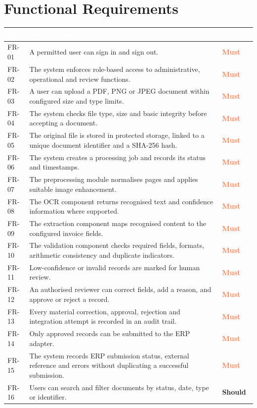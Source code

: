 \documentclass[11pt,a4paper]{report}
\newcommand{\hdr}[1]{\textcolor{white}{\sffamily\bfseries #1}}
\newcommand{\tblstart}{\rowcolors{2}{white}{rowgray}\arrayrulecolor{teal!60}}
\newcommand{\hdrrow}{\rowcolor{navy}}
\newcommand{\must}{\textcolor{coral}{\sffamily\bfseries Must}}
\newcommand{\should}{\textcolor{amber!85!black}{\sffamily\bfseries Should}}
\begin{document}
\section{Functional Requirements}
{\tblstart\small
\begin{longtable}{L{1.4cm}L{11.1cm}L{1.4cm}}
\hdrrow \hdr{ID} & \hdr{Requirement} & \hdr{Priority}\\ \endhead
FR-01 & A permitted user can sign in and sign out. & \must\\
FR-02 & The system enforces role-based access to administrative, operational and review functions. & \must\\
FR-03 & A user can upload a PDF, PNG or JPEG document within configured size and type limits. & \must\\
FR-04 & The system checks file type, size and basic integrity before accepting a document. & \must\\
FR-05 & The original file is stored in protected storage, linked to a unique document identifier and a SHA-256 hash. & \must\\
FR-06 & The system creates a processing job and records its status and timestamps. & \must\\
FR-07 & The preprocessing module normalises pages and applies suitable image enhancement. & \must\\
FR-08 & The OCR component returns recognised text and confidence information where supported. & \must\\
FR-09 & The extraction component maps recognised content to the configured invoice fields. & \must\\
FR-10 & The validation component checks required fields, formats, arithmetic consistency and duplicate indicators. & \must\\
FR-11 & Low-confidence or invalid records are marked for human review. & \must\\
FR-12 & An authorised reviewer can correct fields, add a reason, and approve or reject a record. & \must\\
FR-13 & Every material correction, approval, rejection and integration attempt is recorded in an audit trail. & \must\\
FR-14 & Only approved records can be submitted to the ERP adapter. & \must\\
FR-15 & The system records ERP submission status, external reference and errors without duplicating a successful submission. & \must\\
FR-16 & Users can search and filter documents by status, date, type or identifier. & \should\\

\end{longtable}}
\end{document}
